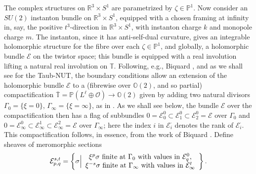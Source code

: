 \documentclass[12pt]{article}
\theoremstyle{definition}
\theoremstyle{remark}
\numberwithin{theorem}{section}
\def\bR{{\mathbb {R}}}
\def\bP{{\mathbb {P}}}
\def\bO{{\mathbb {O}}}
\def\bT{{\mathbb {T}}}
\def\pE{{\mathcal E}}
\def\pO{{\mathcal O}}
\begin{document}
The  complex structures on $\bR^3\times S^1$ are parametrized by $\zeta\in \bP^1$. 
Now consider an $SU(2)$ instanton bundle on $\bR^3\times S^1$, equipped with a chosen framing at infinity in, say, the positive $t^3$-direction in $\bR^3\times S^1$, with instanton charge $k$ and monopole charge $m$. The instanton, since it has anti-self-dual curvature, gives an integrable holomorphic structure for the fibre over each $\zeta\in \bP^1$, and globally, a holomorphic bundle $\pE$ on the twistor space; this bundle is equipped with a real involution lifting a natural real involution on $\bT$.  Following, e.g., Biquard \cite{Biquard91,Biquard97}, and as we shall see for the Taub-NUT, the boundary conditions allow an extension of the holomorphic bundle $\pE$ to a  (fibrewise over $\bO(2)$, and so partial) compactification  $\overline{\bT} = \bP(L^{\ell}\oplus \pO)\rightarrow \bO(2)$ given by adding  two natural divisors $\Gamma_0=\{\xi=0\}$, $\Gamma_\infty=\{\xi=\infty\}$, as in \cite{Charbonneau:2006gu}.  As we shall see below, the bundle $\pE$  over the compactification then has  a flag of subbundles $0=\pE^0_0\subset \pE^0_1\subset \pE^0_2 =\pE$ over  $\Gamma_0$ and $0=\pE_\infty^0\subset \pE_\infty^1\subset \pE_\infty^2 =\pE$ over  $\Gamma_\infty$; here the index $i$ in $\pE^{\cdot}_i$ denotes the rank of $\pE^{\cdot}_i$. This compactification follows, in essence, from the work of Biquard \cite{Biquard91}. Define sheaves of meromorphic sections 
\begin{equation} 
\pE_{p,q}^{s,t}=\left\{\sigma\Big|
\begin{array}{c}\xi^{ p}\sigma\ {\rm finite\ at}\ \Gamma_0\ {\rm with\ values\ in}\ \pE^0_q,\\ \xi^{-s} \sigma\ {\rm finite\ at}\ \Gamma_\infty\ {\rm with\ values\ in}\ \pE_\infty^t
\end{array}
\right\}.
\end{equation}
\end{document}
